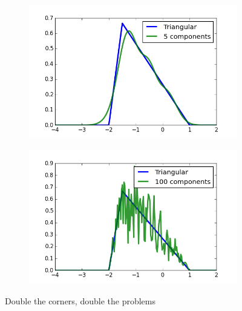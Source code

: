 \documentclass[11pt,a4paper]{book}
\begin{document}
\begin{figure}[h]
  \centering
  \begin{subfigure}{0.45\textwidth}
    \centering
    \includegraphics[width=\textwidth]{thesis/em/triangular-5-components}
  \end{subfigure}
  \hfill
  \begin{subfigure}{0.45\textwidth}
    \centering
    \includegraphics[width=\textwidth]{thesis/em/triangular-100-components}
  \end{subfigure}
  \caption{Double the corners, double the problems}
  \label{fig:em-triangular}
\end{figure}
\end{document}
